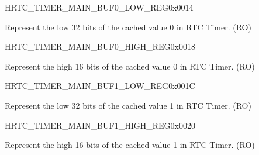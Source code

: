 \begin{register}{H}{RTC\_TIMER\_MAIN\_BUF0\_LOW\_REG}{0x0014}\label{regdesc:RTCTIMERMAINBUF0LOWREG}
%
\regnewline%
\begin{regdesc}\begin{reglist}
\label{fielddesc:RTCTIMERMAINTIMERBUF0LOW}
\item [RTC\_TIMER\_MAIN\_TIMER\_BUF0\_LOW] Represent the low 32 bits of the cached value 0 in RTC Timer. (RO)
\end{reglist}\end{regdesc}
\end{register}


\begin{register}{H}{RTC\_TIMER\_MAIN\_BUF0\_HIGH\_REG}{0x0018}\label{regdesc:RTCTIMERMAINBUF0HIGHREG}
%
%
\regnewline%
\begin{regdesc}\begin{reglist}
\label{fielddesc:RTCTIMERMAINTIMERBUF0HIGH}
\item [RTC\_TIMER\_MAIN\_TIMER\_BUF0\_HIGH] Represent the high 16 bits of the cached value 0 in RTC Timer. (RO)
\end{reglist}\end{regdesc}
\end{register}


\begin{register}{H}{RTC\_TIMER\_MAIN\_BUF1\_LOW\_REG}{0x001C}\label{regdesc:RTCTIMERMAINBUF1LOWREG}
%
\regnewline%
\begin{regdesc}\begin{reglist}
\label{fielddesc:RTCTIMERMAINTIMERBUF1LOW}
\item [RTC\_TIMER\_MAIN\_TIMER\_BUF1\_LOW] Represent the low 32 bits of the cached value 1 in RTC Timer. (RO)
\end{reglist}\end{regdesc}
\end{register}


\begin{register}{H}{RTC\_TIMER\_MAIN\_BUF1\_HIGH\_REG}{0x0020}\label{regdesc:RTCTIMERMAINBUF1HIGHREG}
%
%
\regnewline%
\begin{regdesc}\begin{reglist}
\label{fielddesc:RTCTIMERMAINTIMERBUF1HIGH}\item [RTC\_TIMER\_MAIN\_TIMER\_BUF1\_HIGH] Represent the high 16 bits of the cached value 1 in RTC Timer. (RO)
\end{reglist}\end{regdesc}
\end{register}


